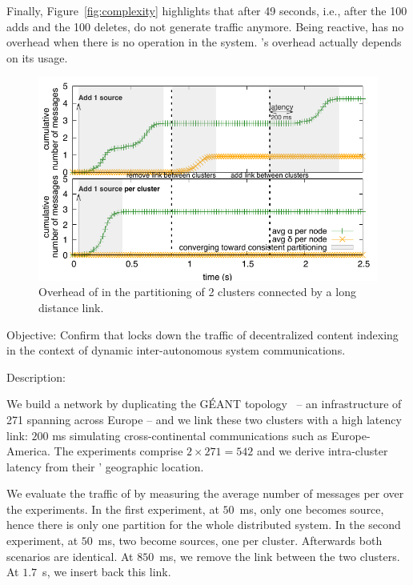 \begin{asparadesc}
\noindent Finally, Figure~\ref{fig:complexity} highlights that after
49 seconds, i.e., after the 100 adds and the 100 deletes, \processes
do not generate traffic anymore. Being reactive, \NAME has no overhead
when there is no operation in the system. \NAME's overhead actually
depends on its usage.

\end{asparadesc}



\begin{asparadesc}

\begin{figure}
  \centering\includegraphics[width=\FIGSCALE\columnwidth]{img/as_cast_geant.pdf}
  \caption{\label{fig:geant}Overhead of \NAME in the partitioning of 2 clusters connected by a long distance link.}
\end{figure}

  
\item [Objective:] Confirm that \NAME locks down the traffic of
  decentralized content indexing in the context of dynamic
  inter-autonomous system communications.
  
\item [Description:]

We build a network by duplicating the G{\'E}ANT
topology~\cite{knight2011internet} -- an infrastructure of 271 \nodes
spanning across Europe -- and we link these two clusters with a high
latency link: $200$ ms simulating cross-continental communications
such as Europe-America. The experiments comprise $2 \times 271 = 542$
\processes and we derive intra-cluster latency from their \processes'
geographic location.

\noindent We evaluate the traffic of \NAME by measuring the average
number of messages per \process over the experiments. In the first
experiment, at $50$~ms, only one \process becomes source, hence there
is only one partition for the whole distributed system. In the second
experiment, at $50$~ms, two \processes become sources, one per
cluster. Afterwards both scenarios are identical. At $850$~ms, we
remove the link between the two clusters. At $1.7$~s, we insert back this
link.



\end{asparadesc}
